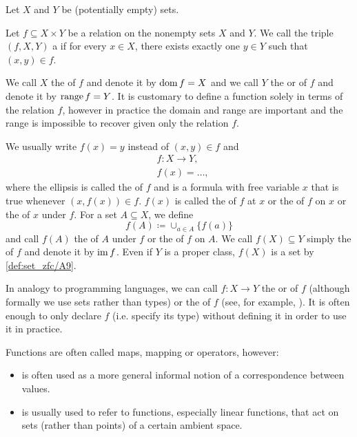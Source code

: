 \begin{definition}\label{def:function}
  Let \( X \) and \( Y \) be (potentially empty) sets.

  Let \( f \subseteq X \times Y \) be a relation on the nonempty sets \( X \) and \( Y \). We call the triple \( (f, X, Y) \) a  if for every \( x \in X \), there exists exactly one \( y \in Y \) such that \( (x, y) \in f \).

  We call \( X \) the  of \( f \) and denote it by \( \operatorname{dom} f = X \) and we call \( Y \) the  or  of \( f \) and denote it by \( \operatorname{range} f = Y \). It is customary to define a function solely in terms of the relation \( f \), however in practice the domain and range are important and the range is impossible to recover given only the relation \( f \).

  We usually write \( f(x) = y \) instead of \( (x, y) \in f \) and
  \begin{align*}
    &f: X \to Y, \\
    &f(x) = \ldots,
  \end{align*}
  where the ellipsis is called the  of \( f \) and is a formula with free variable \( x \) that is true whenever \( (x, f(x)) \in f \). \( f(x) \) is called the  of \( f \) at \( x \) or the  of \( f \) on \( x \) or the  of \( x \) under \( f \). For a set \( A \subseteq X \), we define
  \begin{equation*}
    f(A) \coloneqq \cup_{a \in A} \{ f(a) \}
  \end{equation*}
  and call \( f(A) \) the  of \( A \) under \( f \) or the  of \( f \) on \( A \). We call \( f(X) \subseteq Y \) simply the  of \( f \) and denote it by \( \operatorname{im} f \). Even if \( Y \) is a proper class, \( f(X) \) is a set by \cref{def:set_zfc/A9}.

  In analogy to programming languages, we can call \( f: X \to Y \) the  or  of \( f \) (although formally we use sets rather than types) or the  of \( f \) (see, for example, \cite[section 2.4]{Kernighan1988}). It is often enough to only declare \( f \) (i.e. specify its type) without defining it in order to use it in practice.

  Functions are often called maps, mapping or operators, however:
  \begin{itemize}
    \item {} is often used as a more general informal notion of a correspondence between values.
    \item {} is usually used to refer to functions, especially linear functions, that act on sets (rather than points) of a certain ambient space.
  \end{itemize}


\end{definition}
